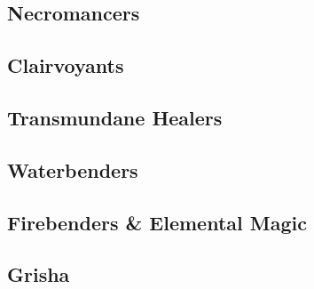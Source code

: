 \documentclass{LegrandOrangeTufteBook}
\begin{document}
\subsection*{Necromancers}

\subsection*{Clairvoyants}

\subsection*{Transmundane Healers}

\subsection*{Waterbenders}

\subsection*{Firebenders \& Elemental Magic}

\subsection*{Grisha}
\end{document}
